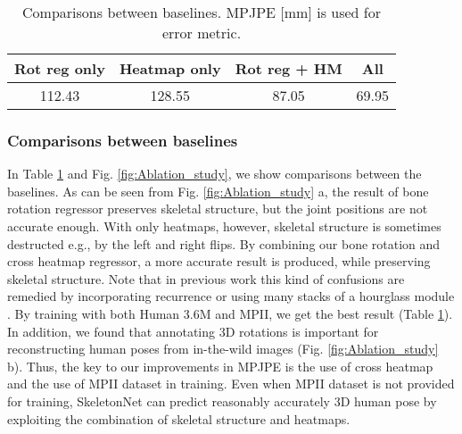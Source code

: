 \begin{table}[hbt]
	\begin{center}
		\caption{Comparisons between baselines. MPJPE [mm] is used for error metric. }
		\label{tab:comparison2}
		
		\begin{tabular}{c c c c }
			\hline 
			Rot reg only \;\;\;& Heatmap only \;\;\; &	Rot reg + HM \;\;\; & All \\ 
			\hline  112.43 \;\;\;   & 128.55 \;\;\;  & 87.05 \;\;\; & 69.95 \\ 
			\hline 
		\end{tabular}
		
	\end{center}
\end{table}

\subsubsection{Comparisons between baselines}

In  Table \ref{tab:comparison2} and Fig. \ref{fig:Ablation_study}, we show comparisons between the baselines. As can be seen from Fig. \ref{fig:Ablation_study} a, the result of bone rotation regressor preserves skeletal structure, but the joint positions are not accurate enough. With only heatmaps, however, skeletal structure is sometimes destructed e.g., by the left and right flips. By combining our bone rotation and cross heatmap regressor, a more accurate result is produced, while preserving skeletal structure. Note that in previous work this kind of confusions are remedied by incorporating recurrence \cite{belagiannis2016recurrent} or using many stacks of a hourglass module \cite{newell2016stacked}. By training with both Human 3.6M and MPII, we get the best result (Table \ref{tab:comparison2}). In addition, we found that annotating 3D rotations is important for reconstructing human poses from in-the-wild images (Fig. \ref{fig:Ablation_study} b). Thus, the key to our improvements in MPJPE is the use of cross heatmap and the use of MPII dataset in training. Even when MPII dataset is not provided for training, SkeletonNet can predict reasonably accurately 3D human pose by exploiting the combination of skeletal structure and heatmaps. 







